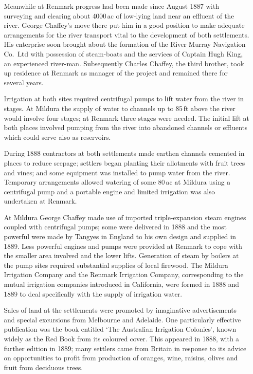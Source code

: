 Meanwhile at Renmark progress had been made since August 1887 with
surveying and clearing about 4000\,ac of low-lying land near an
effluent of the river.  George Chaffey's move there put him in a good
position to make adequate arrangements for the river transport vital
to the development of both settlements.  His enterprise soon brought
about the formation of the River Murray Navigation Co.\ Ltd with
possession of steam-boats and the services of Captain Hugh King, an
experienced river-man.  Subsequently
Charles Chaffey, the third brother, took up residence at Renmark as
manager of the project and remained there for several years.

Irrigation at both sites required centrifugal pumps to lift water from
the river in stages.  At Mildura the supply of water to channels up to
85\,ft above the river would involve four stages; at Renmark three
stages were needed.  The initial lift at both places involved pumping
from the river into abandoned channels or effluents which could serve
also as reservoirs.

During 1888 contractors at both settlements made earthen channels
cemented in places to reduce seepage; settlers began planting their
allotments with fruit trees and vines; and some equipment was
installed to pump water from the river.  Temporary arrangements
allowed watering of some 80\,ac at Mildura using a centrifugal pump
and a portable engine and limited irrigation was also undertaken at
Renmark.

At Mildura George Chaffey made use of imported triple-expansion steam
engines coupled with centrifugal pumps; some were delivered in 1888
and the most powerful were made by Tangyes in England to his own
design and supplied in 1889.  Less powerful engines and pumps were
provided at Renmark to cope with the smaller area involved and the
lower lifts.  Generation of steam by boilers at the pump sites
required substantial supplies of local firewood.  The Mildura Irrigation Company and the Renmark
Irrigation Company, corresponding to the mutual irrigation companies
introduced in California, were formed in 1888 and 1889 to deal
specifically with the supply of irrigation water.

Sales of land at the settlements were promoted by imaginative
advertisements and special excursions from Melbourne and Adelaide.
One particularly effective publication was the book entitled `The
Australian Irrigation Colonies', known widely as the Red Book from its
coloured cover.  This appeared in 1888, with a further edition in
1889; many settlers came from Britain in response to its advice on
opportunities to profit from production of oranges, wine, raisins,
olives and fruit from deciduous trees.

